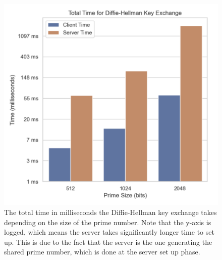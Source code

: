 \documentclass[runningheads]{llncs}
\begin{document}
\begin{figure}[h]
    \centering
    \includegraphics[width=0.7\linewidth]{dh_1.png}
    \caption{The total time in milliseconds the Diffie-Hellman key exchange takes depending on the size of the prime number. Note that the y-axis is logged, which means the server takes significantly longer time to set up. This is due to the fact that the server is the one generating the shared prime number, which is done at the server set up phase. }
    \label{fig:Time to Crack Diffie-Hellman Key Exchange}
\end{figure}
\end{document}
